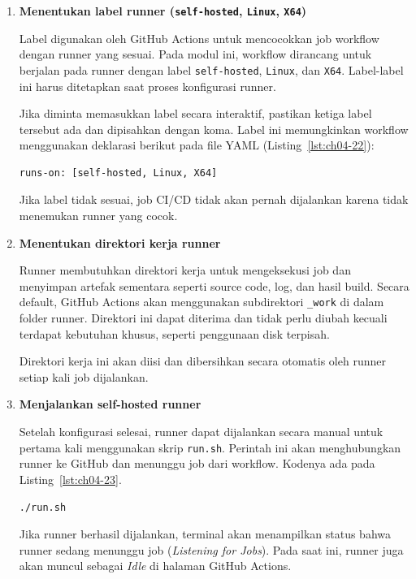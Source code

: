 \begin{enumerate}
\item \textbf{Menentukan label runner (\texttt{self-hosted}, \texttt{Linux}, \texttt{X64})}

Label digunakan oleh GitHub Actions untuk mencocokkan job workflow dengan
runner yang sesuai. Pada modul ini, workflow dirancang untuk berjalan pada
runner dengan label \texttt{self-hosted}, \texttt{Linux}, dan \texttt{X64}.
Label-label ini harus ditetapkan saat proses konfigurasi runner.

Jika diminta memasukkan label secara interaktif, pastikan ketiga label
tersebut ada dan dipisahkan dengan koma. Label ini memungkinkan workflow
menggunakan deklarasi berikut pada file YAML (Listing~\ref{lst:ch04-22}):

\begin{lstlisting}[language=bash, caption={Potongan kode pada Tutorial (3)}, label={lst:ch04-22}]
runs-on: [self-hosted, Linux, X64]
\end{lstlisting}

Jika label tidak sesuai, job CI/CD tidak akan pernah dijalankan karena
tidak menemukan runner yang cocok.

\item \textbf{Menentukan direktori kerja runner}

Runner membutuhkan direktori kerja untuk mengeksekusi job dan menyimpan
artefak sementara seperti source code, log, dan hasil build. Secara default,
GitHub Actions akan menggunakan subdirektori \texttt{\_work} di dalam folder
runner. Direktori ini dapat diterima dan tidak perlu diubah kecuali terdapat
kebutuhan khusus, seperti penggunaan disk terpisah.

Direktori kerja ini akan diisi dan dibersihkan secara otomatis oleh runner
setiap kali job dijalankan.

\item \textbf{Menjalankan self-hosted runner}

Setelah konfigurasi selesai, runner dapat dijalankan secara manual untuk
pertama kali menggunakan skrip \texttt{run.sh}. Perintah ini akan
menghubungkan runner ke GitHub dan menunggu job dari workflow. Kodenya ada pada Listing~\ref{lst:ch04-23}.

\begin{lstlisting}[language=bash, caption={Potongan kode pada Tutorial (4)}, label={lst:ch04-23}]
./run.sh
\end{lstlisting}

Jika runner berhasil dijalankan, terminal akan menampilkan status bahwa
runner sedang menunggu job (\textit{Listening for Jobs}). Pada saat ini,
runner juga akan muncul sebagai \textit{Idle} di halaman GitHub Actions.


\end{enumerate}
